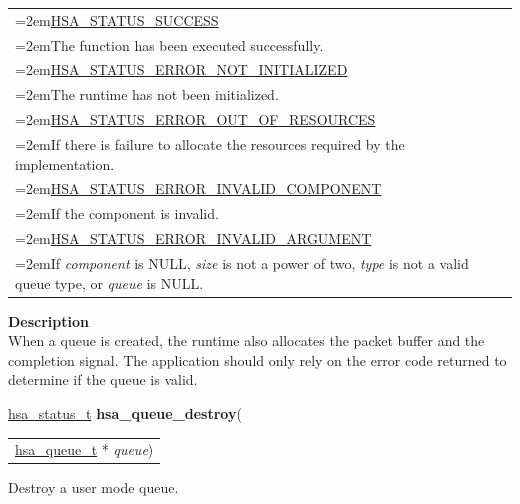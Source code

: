 \documentclass[final]{book}
\newcommand{\hsaarg}[1]{\textit{#1}}
\begin{document}
\noindent\begin{longtable}{@{}>{\hangindent=2em}p{\linewidth}}
\hyperlink{group__status_1ggad755322e7ff95456520e8abdbe90d225ae382ea0c9c05cce5a60d0317375159cc}{HSA_STATUS_SUCCESS}\\\hspace{2em}The function has been executed successfully.\\[2mm]
\hyperlink{group__status_1ggad755322e7ff95456520e8abdbe90d225a34ea59ade5bfce95eee935238a99f5b5}{HSA_STATUS_ERROR_NOT_INITIALIZED}\\\hspace{2em}The runtime has not been initialized.\\[2mm]
\hyperlink{group__status_1ggad755322e7ff95456520e8abdbe90d225a1a77fcf36d0d140874c4361ab093eff7}{HSA_STATUS_ERROR_OUT_OF_RESOURCES}\\\hspace{2em}If there is failure to allocate the resources required by the implementation.\\[2mm]
\hyperlink{group__status_1ggad755322e7ff95456520e8abdbe90d225ac136a6651d66e234971df5083600bbd0}{HSA_STATUS_ERROR_INVALID_COMPONENT}\\\hspace{2em}If the component is invalid.\\[2mm]
\hyperlink{group__status_1ggad755322e7ff95456520e8abdbe90d225ac7d3651f75107d2a6a8ba3b25683c030}{HSA_STATUS_ERROR_INVALID_ARGUMENT}\\\hspace{2em}If \textit{component} is NULL, \textit{size} is not a power of two, \textit{type} is not a valid queue type, or \textit{queue} is NULL.
\end{longtable}
\vspace{-4mm}\noindent\textbf{Description}\\[1mm]
When a queue is created, the runtime also allocates the packet buffer and the completion signal. The application should only rely on the error code returned to determine if the queue is valid. 


\noindent\begin{tcolorbox}[breakable,nobeforeafter,colframe=white,colback=lightgray,left=0mm]
\hyperlink{group__status_1gad755322e7ff95456520e8abdbe90d225}{hsa_status_t} \hypertarget{group__queue_1ga2669dc4c7190f2ba65b453110a92ceb5}{\textbf{hsa_queue_destroy}}(
\vspace{-3.5mm}\begin{longtable}{@{}p{\textwidth}}
\hspace{1.7em}\hyperlink{group__queue_1gacbb2835331f18aee30ee441f07b3fc5a}{hsa_queue_t} * \hsaarg{queue})\end{longtable}

\end{tcolorbox}
Destroy a user mode queue.
\end{document}
